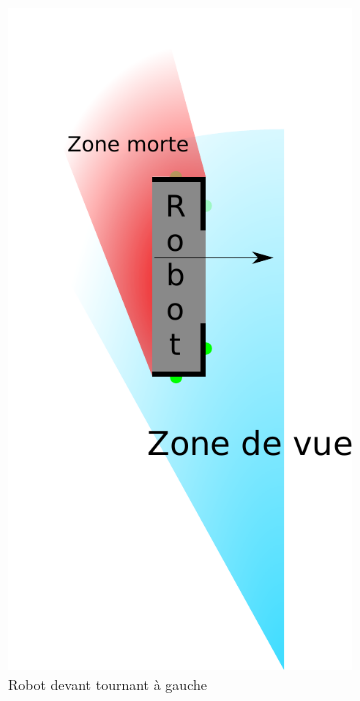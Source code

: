 \begin{itemize}
\begin{figure}[H]
\begin{subfigure}[h]{0.2\textwidth}
					        \includegraphics[width=\textwidth]{Graphics/casClignotants_DD.pdf}
					        \caption{Robot devant tournant à gauche}
					    \end{subfigure}
					    ~
						\begin{subfigure}[h]{0.35\textwidth}

\end{subfigure}
\end{figure}
\end{itemize}
